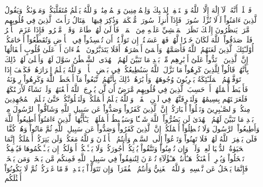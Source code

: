 فَٱعۡلَمۡ أَنَّهُۥ لَآ إِلَٰهَ إِلَّا ٱللَّهُ وَٱسۡتَغۡفِرۡ لِذَنۢبِكَ وَلِلۡمُؤۡمِنِينَ وَٱلۡمُؤۡمِنَٰتِۗ وَٱللَّهُ يَعۡلَمُ مُتَقَلَّبَكُمۡ وَمَثۡوَىٰكُمۡ
وَيَقُولُ ٱلَّذِينَ ءَامَنُواْ لَوۡلَا نُزِّلَتۡ سُورَةٞۖ فَإِذَآ أُنزِلَتۡ سُورَةٞ مُّحۡكَمَةٞ وَذُكِرَ فِيهَا ٱلۡقِتَالُ رَأَيۡتَ ٱلَّذِينَ فِي قُلُوبِهِم مَّرَضٞ يَنظُرُونَ إِلَيۡكَ نَظَرَ ٱلۡمَغۡشِيِّ عَلَيۡهِ مِنَ ٱلۡمَوۡتِۖ فَأَوۡلَىٰ لَهُمۡ
طَاعَةٞ وَقَوۡلٞ مَّعۡرُوفٞۚ فَإِذَا عَزَمَ ٱلۡأَمۡرُ فَلَوۡ صَدَقُواْ ٱللَّهَ لَكَانَ خَيۡرٗا لَّهُمۡ
فَهَلۡ عَسَيۡتُمۡ إِن تَوَلَّيۡتُمۡ أَن تُفۡسِدُواْ فِي ٱلۡأَرۡضِ وَتُقَطِّعُوٓاْ أَرۡحَامَكُمۡ
أُوْلَـٰٓئِكَ ٱلَّذِينَ لَعَنَهُمُ ٱللَّهُ فَأَصَمَّهُمۡ وَأَعۡمَىٰٓ أَبۡصَٰرَهُمۡ
أَفَلَا يَتَدَبَّرُونَ ٱلۡقُرۡءَانَ أَمۡ عَلَىٰ قُلُوبٍ أَقۡفَالُهَآ
إِنَّ ٱلَّذِينَ ٱرۡتَدُّواْ عَلَىٰٓ أَدۡبَٰرِهِم مِّنۢ بَعۡدِ مَا تَبَيَّنَ لَهُمُ ٱلۡهُدَى ٱلشَّيۡطَٰنُ سَوَّلَ لَهُمۡ وَأَمۡلَىٰ لَهُمۡ
ذَٰلِكَ بِأَنَّهُمۡ قَالُواْ لِلَّذِينَ كَرِهُواْ مَا نَزَّلَ ٱللَّهُ سَنُطِيعُكُمۡ فِي بَعۡضِ ٱلۡأَمۡرِۖ وَٱللَّهُ يَعۡلَمُ إِسۡرَارَهُمۡ
فَكَيۡفَ إِذَا تَوَفَّتۡهُمُ ٱلۡمَلَـٰٓئِكَةُ يَضۡرِبُونَ وُجُوهَهُمۡ وَأَدۡبَٰرَهُمۡ
ذَٰلِكَ بِأَنَّهُمُ ٱتَّبَعُواْ مَآ أَسۡخَطَ ٱللَّهَ وَكَرِهُواْ رِضۡوَٰنَهُۥ فَأَحۡبَطَ أَعۡمَٰلَهُمۡ
أَمۡ حَسِبَ ٱلَّذِينَ فِي قُلُوبِهِم مَّرَضٌ أَن لَّن يُخۡرِجَ ٱللَّهُ أَضۡغَٰنَهُمۡ
وَلَوۡ نَشَآءُ لَأَرَيۡنَٰكَهُمۡ فَلَعَرَفۡتَهُم بِسِيمَٰهُمۡۚ وَلَتَعۡرِفَنَّهُمۡ فِي لَحۡنِ ٱلۡقَوۡلِۚ وَٱللَّهُ يَعۡلَمُ أَعۡمَٰلَكُمۡ
وَلَنَبۡلُوَنَّكُمۡ حَتَّىٰ نَعۡلَمَ ٱلۡمُجَٰهِدِينَ مِنكُمۡ وَٱلصَّـٰبِرِينَ وَنَبۡلُوَاْ أَخۡبَارَكُمۡ
إِنَّ ٱلَّذِينَ كَفَرُواْ وَصَدُّواْ عَن سَبِيلِ ٱللَّهِ وَشَآقُّواْ ٱلرَّسُولَ مِنۢ بَعۡدِ مَا تَبَيَّنَ لَهُمُ ٱلۡهُدَىٰ لَن يَضُرُّواْ ٱللَّهَ شَيۡـٔٗا وَسَيُحۡبِطُ أَعۡمَٰلَهُمۡ
۞يَـٰٓأَيُّهَا ٱلَّذِينَ ءَامَنُوٓاْ أَطِيعُواْ ٱللَّهَ وَأَطِيعُواْ ٱلرَّسُولَ وَلَا تُبۡطِلُوٓاْ أَعۡمَٰلَكُمۡ
إِنَّ ٱلَّذِينَ كَفَرُواْ وَصَدُّواْ عَن سَبِيلِ ٱللَّهِ ثُمَّ مَاتُواْ وَهُمۡ كُفَّارٞ فَلَن يَغۡفِرَ ٱللَّهُ لَهُمۡ
فَلَا تَهِنُواْ وَتَدۡعُوٓاْ إِلَى ٱلسَّلۡمِ وَأَنتُمُ ٱلۡأَعۡلَوۡنَ وَٱللَّهُ مَعَكُمۡ وَلَن يَتِرَكُمۡ أَعۡمَٰلَكُمۡ
إِنَّمَا ٱلۡحَيَوٰةُ ٱلدُّنۡيَا لَعِبٞ وَلَهۡوٞۚ وَإِن تُؤۡمِنُواْ وَتَتَّقُواْ يُؤۡتِكُمۡ أُجُورَكُمۡ وَلَا يَسۡـَٔلۡكُمۡ أَمۡوَٰلَكُمۡ
إِن يَسۡـَٔلۡكُمُوهَا فَيُحۡفِكُمۡ تَبۡخَلُواْ وَيُخۡرِجۡ أَضۡغَٰنَكُمۡ
هَـٰٓأَنتُمۡ هَـٰٓؤُلَآءِ تُدۡعَوۡنَ لِتُنفِقُواْ فِي سَبِيلِ ٱللَّهِ فَمِنكُم مَّن يَبۡخَلُۖ وَمَن يَبۡخَلۡ فَإِنَّمَا يَبۡخَلُ عَن نَّفۡسِهِۦۚ وَٱللَّهُ ٱلۡغَنِيُّ وَأَنتُمُ ٱلۡفُقَرَآءُۚ وَإِن تَتَوَلَّوۡاْ يَسۡتَبۡدِلۡ قَوۡمًا غَيۡرَكُمۡ ثُمَّ لَا يَكُونُوٓاْ أَمۡثَٰلَكُم